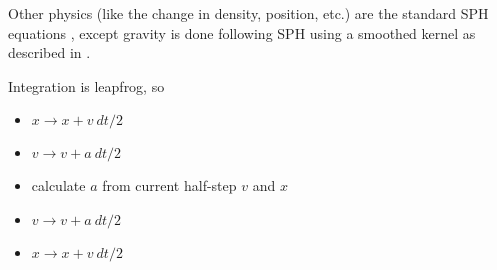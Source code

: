 \documentclass[12pt]{article}
\begin{document}
Other physics (like the change in density, position, etc.) are the standard SPH equations \citep{monaghan05, monaghan92}, except gravity is done following SPH using a smoothed kernel as described in \citet{PM07}.

Integration is leapfrog, so 
\begin{itemize}
    \item $x \to x + v~dt/2$
    \item $v \to v + a~dt/2$
    \item calculate $a$ from current half-step $v$ and $x$
    \item $v \to v + a~dt/2$
    \item $x \to x + v~dt/2$
\end{itemize}



\newpage


\end{document}
